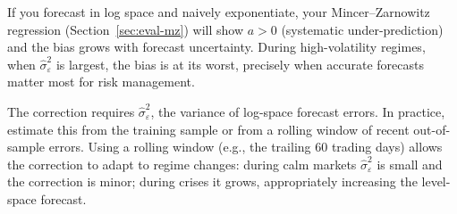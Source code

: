 \begin{warning}
If you forecast in log space and naively exponentiate, your Mincer--Zarnowitz regression (Section~\ref{sec:eval-mz}) will show $a > 0$ (systematic under-prediction) and the bias grows with forecast uncertainty.
During high-volatility regimes, when $\hat{\sigma}^2_\varepsilon$ is largest, the bias is at its worst, precisely when accurate forecasts matter most for risk management.
\end{warning}

\begin{keyidea}
The correction requires $\hat{\sigma}^2_\varepsilon$, the variance of log-space forecast errors.
In practice, estimate this from the training sample or from a rolling window of recent out-of-sample errors.
Using a rolling window (e.g., the trailing 60 trading days) allows the correction to adapt to regime changes: during calm markets $\hat{\sigma}^2_\varepsilon$ is small and the correction is minor; during crises it grows, appropriately increasing the level-space forecast.
\end{keyidea}

